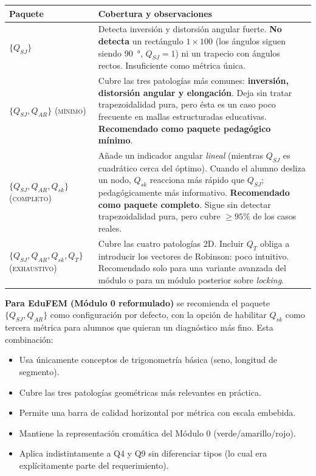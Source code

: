 \documentclass[11pt,a4paper]{article}
\begin{document}
\begin{longtable}{p{4cm} p{11cm}}
\toprule
\textbf{Paquete} & \textbf{Cobertura y observaciones} \\
\midrule
$\{Q_{SJ}\}$ &
Detecta inversi\'on y distorsi\'on angular fuerte. \textbf{No detecta} un rect\'angulo
$1\!\times\!100$ (los \'angulos siguen siendo \SI{90}{\degree}, $Q_{SJ}=1$) ni un trapecio con
\'angulos rectos. Insuficiente como m\'etrica \'unica.\\[2pt]
\rowcolor{green!7}\textbf{$\{Q_{SJ},Q_{AR}\}$} \textsc{(m\'inimo)} &
Cubre las tres patolog\'ias m\'as comunes: \textbf{inversi\'on, distorsi\'on angular y
elongaci\'on}. Deja sin tratar trapezoidalidad pura, pero \'esta es un caso poco frecuente en
mallas estructuradas educativas. \textbf{Recomendado como paquete pedag\'ogico m\'inimo}.\\[2pt]
\rowcolor{green!12}\textbf{$\{Q_{SJ},Q_{AR},Q_{sk}\}$} \textsc{(completo)} &
A\~nade un indicador angular \emph{lineal} (mientras $Q_{SJ}$ es cuadr\'atico cerca del
\'optimo). Cuando el alumno desliza un nodo, $Q_{sk}$ reacciona m\'as r\'apido que $Q_{SJ}$;
pedag\'ogicamente m\'as informativo. \textbf{Recomendado como paquete completo}. Sigue sin
detectar trapezoidalidad pura, pero cubre $\ge 95\%$ de los casos reales.\\[2pt]
$\{Q_{SJ},Q_{AR},Q_{sk},Q_T\}$ \textsc{(exhaustivo)} &
Cubre las cuatro patolog\'ias 2D. Incluir $Q_T$ obliga a introducir los vectores de Robinson:
poco intuitivo. Recomendado solo para una variante avanzada del m\'odulo o para un m\'odulo
posterior sobre \textit{locking}.\\
\bottomrule
\end{longtable}

\begin{recbox}[title=Conclusi\'on operativa]
\textbf{Para EduFEM (M\'odulo 0 reformulado)} se recomienda el paquete
$\{Q_{SJ}, Q_{AR}\}$ como configuraci\'on por defecto, con la opci\'on de habilitar $Q_{sk}$
como tercera m\'etrica para alumnos que quieran un diagn\'ostico m\'as fino. Esta combinaci\'on:
\begin{itemize}[leftmargin=14pt,itemsep=1pt]
  \item Usa \'unicamente conceptos de trigonometr\'ia b\'asica (seno, longitud de segmento).
  \item Cubre las tres patolog\'ias geom\'etricas m\'as relevantes en pr\'actica.
  \item Permite una barra de calidad horizontal por m\'etrica con escala embebida.
  \item Mantiene la representaci\'on crom\'atica del M\'odulo 0 (verde/amarillo/rojo).
  \item Aplica indistintamente a Q4 y Q9 sin diferenciar tipos (lo cual era expl\'icitamente
  parte del requerimiento).
\end{itemize}
\end{recbox}
\end{document}
